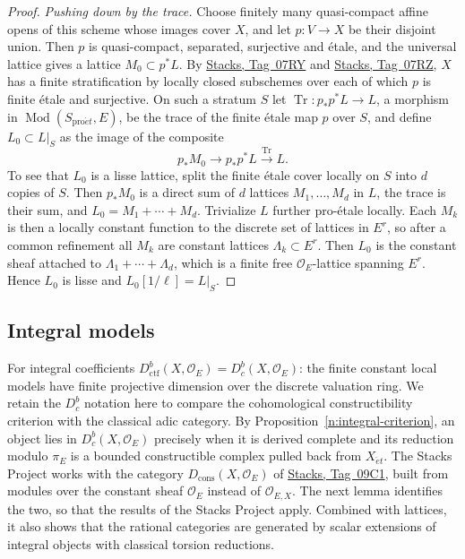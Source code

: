 \documentclass[11pt,a4paper]{article}
\numberwithin{equation}{section}
\theoremstyle{definition}
\theoremstyle{remark}
\newcommand{\Dbc}{D^b_c}
\newcommand{\Mod}{\operatorname{Mod}}
\newcommand{\et}{\acute{e}t}
\newcommand{\proet}{\mathrm{pro}\acute{e}t}
\newcommand{\stacks}[1]{\href{https://stacks.math.columbia.edu/tag/#1}{\textnormal{Stacks, Tag~#1}}}
\newcommand{\Dc}{D_{\mathrm{cons}}}
\newcommand{\Dctf}{D^b_{\mathrm{ctf}}}
\begin{document}
\begin{proof}
\emph{Pushing down by the trace.} Choose finitely many quasi-compact
affine opens of this scheme whose images cover $X$, and let
$p:V\to X$ be their disjoint union. Then $p$ is quasi-compact, separated,
surjective and \'etale, and the universal lattice gives a lattice
$M_0\subset p^*L$. By \stacks{07RY} and \stacks{07RZ}, $X$ has a finite
stratification by locally closed subschemes over each of which $p$ is
finite \'etale and surjective. On such a stratum $S$ let
$\operatorname{Tr}:p_*p^*L\to L$, a morphism in $\Mod(S_{\proet},E)$, be
the trace of the finite \'etale map $p$ over $S$, and define $L_0\subset L|_S$ as the image of the composite
\[
 p_*M_0\longrightarrow p_*p^*L\xrightarrow{\operatorname{Tr}}L.
\]
To see that $L_0$ is a lisse lattice, split the finite \'etale cover
locally on $S$ into $d$ copies of $S$. Then $p_*M_0$ is a direct sum of
$d$ lattices $M_1,\dots,M_d$ in $L$, the trace is their sum, and
$L_0=M_1+\cdots+M_d$. Trivialize $L$ further pro-\'etale locally. Each
$M_k$ is then a locally constant function to the discrete set of lattices
in $E^r$, so after a common refinement all $M_k$ are constant lattices
$\Lambda_k\subset E^r$. Then $L_0$ is the constant sheaf attached to
$\Lambda_1+\cdots+\Lambda_d$, which is a finite free $\mathcal O_E$-lattice
spanning $E^r$. Hence $L_0$ is lisse and $L_0[1/\ell]=L|_S$.
\end{proof}

\subsection{Integral models}

For integral coefficients $\Dctf(X,\mathcal O_E)=\Dbc(X,\mathcal O_E)$:
the finite constant local models have finite projective dimension over
the discrete valuation ring. We retain the $\Dbc$ notation here to
compare the cohomological constructibility criterion with the classical
adic category. By Proposition~\ref{n:integral-criterion}, an object lies in
$\Dbc(X,\mathcal O_E)$ precisely when it is derived complete and its
reduction modulo $\pi_E$ is a bounded constructible complex pulled back
from $X_{\et}$.
The Stacks Project works with the category $\Dc(X,\mathcal O_E)$
of \stacks{09C1}, built from modules over the constant sheaf
$\mathcal O_E$ instead of $\mathcal O_{E,X}$. The next lemma identifies
the two, so that the results of the Stacks Project apply. Combined with
lattices, it also shows that the rational categories are generated by
scalar extensions of integral objects with classical torsion reductions.
\end{document}
